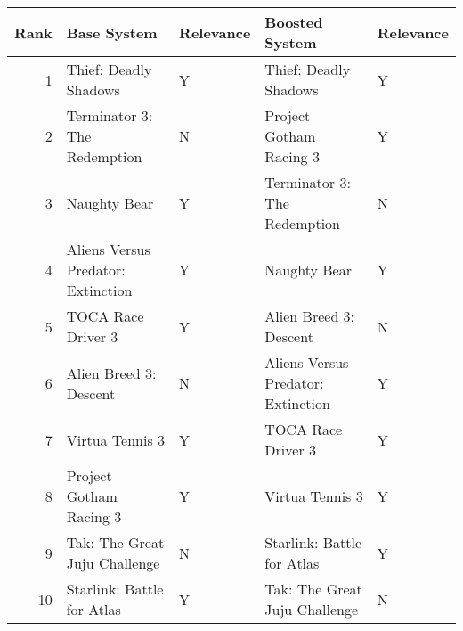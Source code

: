 \begin{tabular}{rllll}
\toprule
 Rank &                        Base System & Relevance &                     Boosted System & Relevance \\
\midrule
    1 &              Thief: Deadly Shadows &         Y &              Thief: Deadly Shadows &         Y \\
    2 &       Terminator 3: The Redemption &         N &            Project Gotham Racing 3 &         Y \\
    3 &                       Naughty Bear &         Y &       Terminator 3: The Redemption &         N \\
    4 & Aliens Versus Predator: Extinction &         Y &                       Naughty Bear &         Y \\
    5 &                 TOCA Race Driver 3 &         Y &             Alien Breed 3: Descent &         N \\
    6 &             Alien Breed 3: Descent &         N & Aliens Versus Predator: Extinction &         Y \\
    7 &                    Virtua Tennis 3 &         Y &                 TOCA Race Driver 3 &         Y \\
    8 &            Project Gotham Racing 3 &         Y &                    Virtua Tennis 3 &         Y \\
    9 &      Tak: The Great Juju Challenge &         N &         Starlink: Battle for Atlas &         Y \\
   10 &         Starlink: Battle for Atlas &         Y &      Tak: The Great Juju Challenge &         N \\
\bottomrule
\end{tabular}
